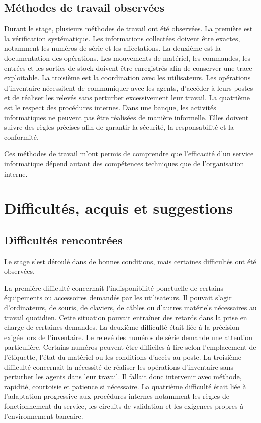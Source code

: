\documentclass[12pt,a4paper]{report}
\begin{document}
\section{Méthodes de travail observées}

Durant le stage, plusieurs méthodes de travail ont été observées.
La première est la vérification systématique. Les informations collectées doivent être exactes, notamment les numéros de série et les affectations.
La deuxième est la documentation des opérations. Les mouvements de matériel, les commandes, les entrées et les sorties de stock doivent être enregistrés afin de conserver une trace exploitable.
La troisième est la coordination avec les utilisateurs. Les opérations d'inventaire nécessitent de communiquer avec les agents, d'accéder à leurs postes et de réaliser les relevés sans perturber excessivement leur travail.
La quatrième est le respect des procédures internes. Dans une banque, les activités informatiques ne peuvent pas être réalisées de manière informelle. Elles doivent suivre des règles précises afin de garantir la sécurité, la responsabilité et la conformité.

Ces méthodes de travail m'ont permis de comprendre que l'efficacité d'un service informatique dépend autant des compétences techniques que de l'organisation interne.

\chapter{Difficultés, acquis et suggestions}

\section{Difficultés rencontrées}

Le stage s'est déroulé dans de bonnes conditions, mais certaines difficultés ont été observées.

La première difficulté concernait l'indisponibilité ponctuelle de certains équipements ou accessoires demandés par les utilisateurs. Il pouvait s'agir d'ordinateurs, de souris, de claviers, de câbles ou d'autres matériels nécessaires au travail quotidien. Cette situation pouvait entraîner des retards dans la prise en charge de certaines demandes.
La deuxième difficulté était liée à la précision exigée lors de l'inventaire. Le relevé des numéros de série demande une attention particulière. Certains numéros peuvent être difficiles à lire selon l'emplacement de l'étiquette, l'état du matériel ou les conditions d'accès au poste.
La troisième difficulté concernait la nécessité de réaliser les opérations d'inventaire sans perturber les agents dans leur travail. Il fallait donc intervenir avec méthode, rapidité, courtoisie et patience si nécessaire.
La quatrième difficulté était liée à l'adaptation progressive aux procédures internes notamment les règles de fonctionnement du service, les circuits de validation et les exigences propres à l'environnement bancaire.
\end{document}
